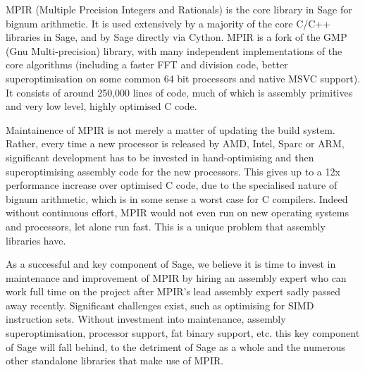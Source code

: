 \begin{workpackage}[id=hpc,wphases=36-48,
  title=High Performance Computing,
  PSRM=1, %
  LLRM=12, %
  SARM=1, %
  UKRM=1, %
  UBRM=1, %
  UJFRM=12]
\begin{tasklist}
\begin{task}[title=MPIR,id=hpc_singular]
MPIR (Multiple Precision Integers and Rationals) is the core library in Sage
for bignum arithmetic. It is used extensively by a majority of the core C/C++
libraries in Sage, and by Sage directly via Cython. MPIR is a fork of the 
GMP (Gnu Multi-precision) library, with many independent implementations of the
core algorithms (including a faster FFT and division code, better 
superoptimisation on some common 64 bit processors and native MSVC support). 
It consists of around 250,000 lines of code, much of which is assembly 
primitives and very low level, highly optimised C code.

Maintainence of MPIR is not merely a matter of updating the build system.
Rather, every time a new processor is released by AMD, Intel, Sparc or ARM,
significant development has to be invested in hand-optimising and then
superoptimising assembly code for the new processors. This gives up to a 12x
performance increase over optimised C code, due to the specialised nature of
bignum arithmetic, which is in some sense a worst case for C compilers. Indeed
without continuous effort, MPIR would not even run on new operating systems and
processors, let alone run fast. This is a unique problem that assembly libraries
have.

As a successful and key component of Sage, we believe it is time to invest in
maintenance and improvement of MPIR by hiring an assembly expert who can work
full time on the project after MPIR's lead assembly expert sadly passed
away recently. Significant challenges exist, such as
optimising for SIMD instruction sets. Without investment into maintenance,
assembly superoptimisation, processor support, fat binary support, etc. this key
component of Sage will fall behind, to the detriment of Sage as a whole and the
numerous other standalone libraries that make use of MPIR.
\end{task}
\begin{task}[title=HPC infrastructure for combinatorics,id=hpc _combi]


\end{task}
\end{tasklist}
\end{workpackage}
